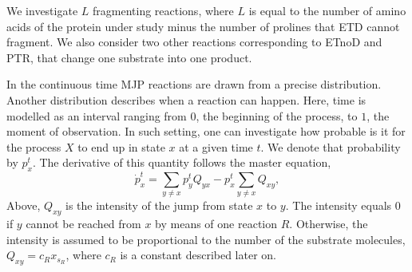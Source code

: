 \documentclass{llncs}
\begin{document}
        We investigate $L$ fragmenting reactions, where $L$ is equal to the number of amino acids of the protein under study minus the number of prolines that ETD cannot fragment. We also consider two other reactions corresponding to ETnoD and PTR, that change one substrate into one product.

        In the continuous time MJP reactions are drawn from a precise distribution. Another distribution describes when a reaction can happen. Here, time is modelled as an interval ranging from $0$, the beginning of the process, to $1$,  the moment of observation. In such setting, one can investigate how probable is it for the process $X$ to end up in state $x$ at a given time $t$. We denote that probability by $p_x^t$. The derivative of this quantity follows the master equation,
                $$\dot{p}_x^t = \sum_{y\not=x} p_y^t Q_{yx} - p_x^t \sum_{y\not=x} Q_{xy},$$
        Above, $Q_{xy}$ is the intensity of the jump from state $x$ to $y$. The intensity equals $0$ if $y$ cannot be reached from $x$ by means of one reaction $R$. Otherwise, the intensity is assumed to be proportional to the number of the substrate molecules, $Q_{xy}=c_R x_{s_R}$,  where $c_R$ is a constant described later on.
\end{document}

